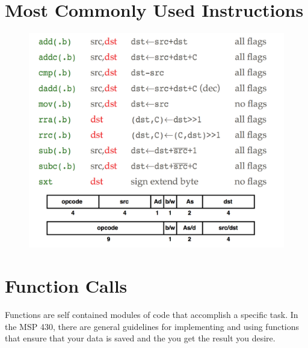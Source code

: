 \documentclass{hw}
\begin{document}
\section{Most Commonly Used Instructions}
\begin{figure}[H]
  \includegraphics[scale=.6]{instructions}
\end{figure}


\section{Function Calls}
Functions are self contained modules of code that accomplish a specific task. 
In the MSP 430, there are general guidelines for implementing and using functions
that ensure that your data is saved and the you get the result you desire. 
\end{document}
